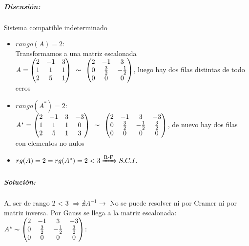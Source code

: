 \subparagraph{Discusión:} Sistema compatible indeterminado
\begin{itemize}
    \item $rango(A) =2$: \\ Transformamos a una matriz escalonada \\
    $A=\left(\begin{matrix}2 & -1 & 3\\1 & 1 & 1\\2 & 5 & 1\end{matrix}\right) \begin{array}{c}
     \thicksim   \\
     \end{array}
 \left(\begin{matrix}2 & -1 & 3\\0 & \frac{3}{2} & - \frac{1}{2}\\0 & 0 & 0\end{matrix}\right) $, luego hay dos filas distintas de todo ceros
    \item $rango(A^*) =2$: \\
    $A^*=\left(\begin{matrix}2 & -1 & 3 & -3\\1 & 1 & 1 & 0\\2 & 5 & 1 & 3\end{matrix}\right)\begin{array}{c}
     \thicksim   \\
    \end{array}
    \left(\begin{matrix}2 & -1 & 3 & -3\\0 & \frac{3}{2} & - \frac{1}{2} & \frac{3}{2}\\0 & 0 & 0 & 0\end{matrix}\right)$, de nuevo hay dos filas con elementos no nulos 
    \item $rg(A)=2 = rg(A^*)=2 < 3 \xRightarrow{\text{R-F}} S.C.I. $
\end{itemize}

\subparagraph{Solución:}
Al ser de rango 2 < 3 $\Rightarrow \nexists A^{-1} \to$ No se puede resolver ni por Cramer ni por matriz inversa.
Por Gauss se llega a la matriz escalonada: \\ $A^* \thicksim \left(\begin{matrix}2 & -1 & 3 & -3\\0 & \frac{3}{2} & - \frac{1}{2} & \frac{3}{2}\\0 & 0 & 0 & 0\end{matrix}\right)$:

